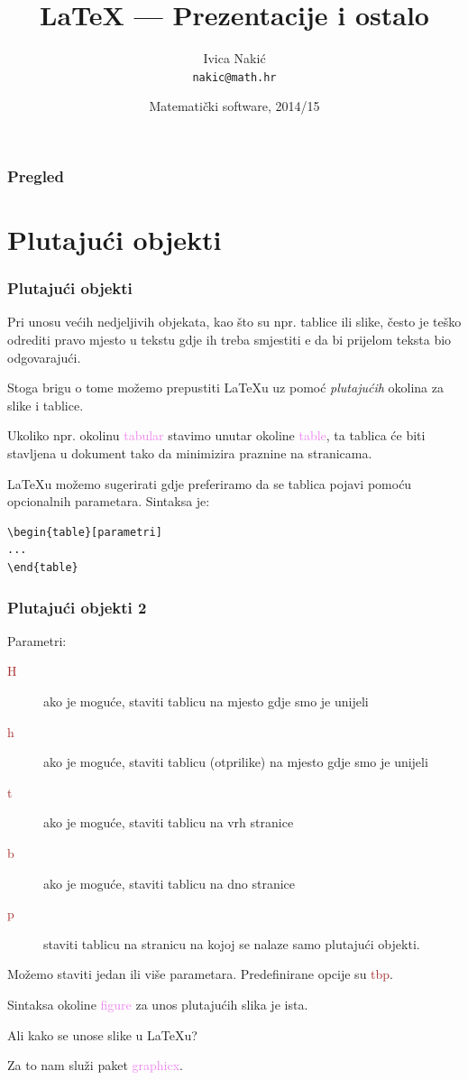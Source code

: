 \documentclass{beamer}
\title{\LaTeX{} --- Prezentacije i ostalo}
\subtitle{}
\author{Ivica Nakić \\ \texttt{nakic@math.hr}}
\institute[PMF--MO]{Matematički odsjek Prirodoslovno--matematičkog fakulteta}
\date[2014/15]{Matematički software, 2014/15}
\theoremstyle{remark}
\theoremstyle{definition}
\begin{document}
\begin{frame}
  \maketitle  
\end{frame}

\begin{frame}
\frametitle{Pregled}
  \tableofcontents  
\end{frame}

\section{Plutajući objekti}

\begin{frame}[fragile]
\frametitle{Plutajući objekti}
Pri unosu većih nedjeljivih objekata, kao što su npr. tablice ili slike, često je teško odrediti pravo mjesto u tekstu gdje ih treba smjestiti e da bi prijelom teksta bio odgovarajući.

Stoga brigu o tome možemo prepustiti \LaTeX{}u uz pomoć \emph{plutajućih} okolina za slike i tablice. 

Ukoliko npr. okolinu \textcolor{violet}{tabular} stavimo unutar okoline \textcolor{violet}{table}, ta tablica će biti stavljena u dokument tako da minimizira praznine na stranicama.

\LaTeX{}u možemo sugerirati gdje preferiramo da se tablica pojavi pomoću opcionalnih parametara. Sintaksa je:
\begin{lstlisting}
\begin{table}[parametri]
...
\end{table}
\end{lstlisting}
\end{frame}

\begin{frame}
\frametitle{Plutajući objekti 2}
Parametri:
\begin{description}
\item[\textcolor{brown}{H}] ako je moguće, staviti tablicu na mjesto gdje smo je unijeli
\item[\textcolor{brown}{h}] ako je moguće, staviti tablicu (otprilike) na mjesto gdje smo je unijeli
\item[\textcolor{brown}{t}] ako je moguće, staviti tablicu na vrh stranice
\item[\textcolor{brown}{b}] ako je moguće, staviti tablicu na dno stranice
\item[\textcolor{brown}{p}] staviti tablicu na stranicu na kojoj se nalaze samo plutajući objekti.
\end{description}
Možemo staviti jedan ili više parametara. Predefinirane opcije su \textcolor{brown}{tbp}.

Sintaksa okoline \textcolor{violet}{figure} za unos plutajućih slika je ista. 

Ali kako se unose slike u \LaTeX u?

Za to nam služi paket \textcolor{violet}{graphicx}. 
\end{frame}
\end{document}

